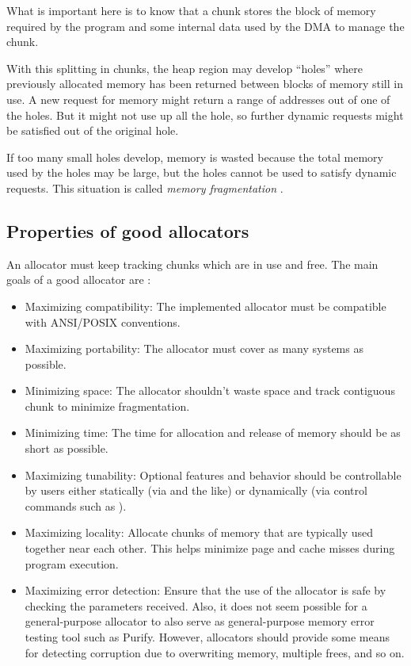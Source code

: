 What is important here is to know that a chunk stores the block of memory required by the program and some internal data used by the DMA to manage the chunk.

With this splitting in chunks, the heap region may develop ``holes'' where previously allocated memory has been returned between blocks of memory still in use.
A new request for memory might return a range of addresses out of one of the holes. But it might not use up all the hole, so further dynamic requests might be satisfied out of the original hole.

If too many small holes develop, memory is wasted because the total memory used by the holes may be large, but the holes cannot be used to satisfy dynamic requests. This situation is called \emph{memory fragmentation} \cite{Knuth73a}. 

\subsection{Properties of good allocators}
An allocator must keep tracking chunks which are in use and free.
The main goals of a good allocator are \cite{Lea12}:
\begin{itemize}
\item Maximizing compatibility: The implemented allocator must be compatible with ANSI/POSIX conventions.
\item Maximizing portability: The allocator must cover as many systems as possible.
\item Minimizing space: The allocator shouldn't waste space and track contiguous chunk to minimize fragmentation.
\item Minimizing time: The time for allocation and release of memory should be as short as possible.
\item Maximizing tunability: Optional features and behavior should be controllable by users either statically (via  and the like) or dynamically (via control commands such as ).
\item Maximizing locality: Allocate chunks of memory that are typically used together near each other. This helps minimize page and cache misses during program execution.
\item Maximizing error detection: Ensure that the use of the allocator is safe by checking the parameters received. 
Also, it does not seem possible for a general-purpose allocator to also serve as general-purpose memory error testing tool such as Purify. However, allocators should provide some means for detecting corruption due to overwriting memory, multiple frees, and so on.
\end{itemize}



